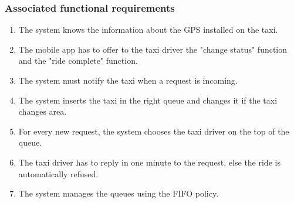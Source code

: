 \subsubsection{Associated functional requirements}
\begin{enumerate}
\item The system knows the information about the GPS installed on the taxi.
\item The mobile app has to offer to the taxi driver the "change status" function and the "ride complete" function.
\item The system must notify the taxi when a request is incoming.
\item The system inserts the taxi in the right queue and changes it if the taxi changes area.
\item For every new request, the system chooses the taxi driver on the top of the queue.
\item The taxi driver has to reply in one minute to the request, else the ride is automatically refused.
\item The system manages the queues using the FIFO policy.
\end{enumerate}